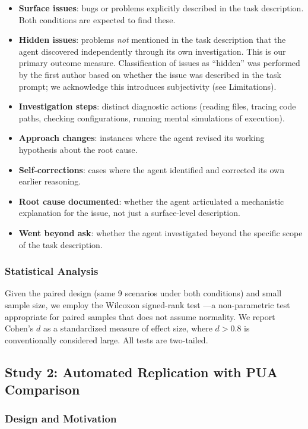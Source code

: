\documentclass[11pt]{article}
\begin{document}
\begin{itemize}
\item \textbf{Surface issues}: bugs or problems explicitly described in the task description. Both conditions are expected to find these.
\item \textbf{Hidden issues}: problems \emph{not} mentioned in the task description that the agent discovered independently through its own investigation. This is our primary outcome measure. Classification of issues as ``hidden'' was performed by the first author based on whether the issue was described in the task prompt; we acknowledge this introduces subjectivity (see Limitations).
\item \textbf{Investigation steps}: distinct diagnostic actions (reading files, tracing code paths, checking configurations, running mental simulations of execution).
\item \textbf{Approach changes}: instances where the agent revised its working hypothesis about the root cause.
\item \textbf{Self-corrections}: cases where the agent identified and corrected its own earlier reasoning.
\item \textbf{Root cause documented}: whether the agent articulated a mechanistic explanation for the issue, not just a surface-level description.
\item \textbf{Went beyond ask}: whether the agent investigated beyond the specific scope of the task description.
\end{itemize}

\subsubsection{Statistical Analysis}

Given the paired design (same 9 scenarios under both conditions) and small sample size, we employ the Wilcoxon signed-rank test \cite{wilcoxon1945individual}---a non-parametric test appropriate for paired samples that does not assume normality. We report Cohen's $d$ \cite{cohen1992power} as a standardized measure of effect size, where $d > 0.8$ is conventionally considered large. All tests are two-tailed.

\subsection{Study 2: Automated Replication with PUA Comparison}

\subsubsection{Design and Motivation}
\end{document}
